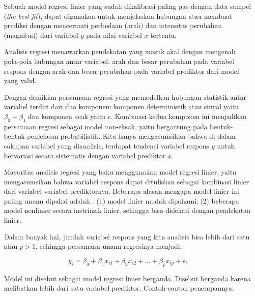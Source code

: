 \documentclass[
]{book}
\begin{document}
Sebuah model regresi linier yang sudah dikalibrasi paling pas dengan
data sampel (\emph{the best fit}), dapat digunakan untuk menjelaskan hubungan
atau membuat prediksi dengan mencermati perbedaan (arah) dan intensitas
perubahan (magnitud) dari variabel \(y\) pada nilai variabel \(x\) tertentu.

Analisis regresi menawarkan pendekatan yang masuk akal dengan mengenali
pola-pola hubungan antar variabel: arah dan besar perubahan pada
variabel respons dengan arah dan besar perubahan pada variabel prediktor
dari model yang valid.

Dengan demikian persamaan regresi yang memodelkan hubungan statistik
antar variabel terdiri dari dua komponen: komponen deterministik atau
sinyal yaitu \(\beta_0 + \beta_1\) dan komponen acak yaitu \(\epsilon\). Kombinasi kedua komponen ini menjadikan persamaan regresi sebagai model non-eksak, yaitu bergantung pada bentuk-bentuk penjelasan probabilistik. Kita hanya mengasumsikan bahwa di dalam cakupan variabel yang dianalisis, terdapat tendensi variabel respons \(y\) untuk bervariasi secara sistematis dengan
variabel prediktor \(x\).

Mayoritas analisis regresi yang baku menggunakan model regresi linier,
yaitu mengasumsikan bahwa variabel respons dapat dituliskan sebagai
kombinasi linier dari variabel-variabel prediktornya. Beberapa alasan
mengapa model linier ini paling umum dipakai adalah \citep{rawlings1998}: (1)
model linier mudah dipahami; (2) beberapa model nonlinier secara
instrinsik linier, sehingga bisa didekati dengan pendekatan linier.

Dalam banyak hal, jumlah variabel respons yang kita analisis bisa lebih dari satu atau \(p>1\), sehingga persamaan umum regresinya menjadi:

\begin{equation} 
y_i=\beta_0 + \beta_1x_{i1} + \beta_2x_{i2} + ... + \beta_px_{ip} + \epsilon_i
\label{eq:persamaan-multi}
\end{equation}

Model ini disebut sebagai model regresi linier berganda. Disebut
berganda karena melibatkan lebih dari satu variabel
prediktor. Contoh-contoh penerapannya:
\end{document}
